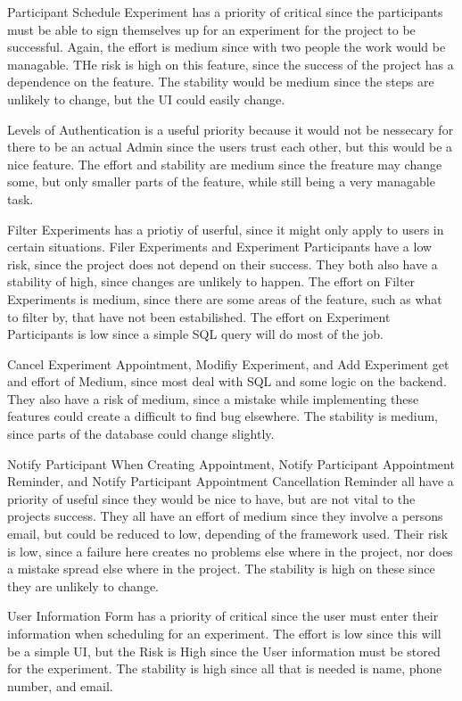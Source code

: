 Participant Schedule Experiment has a priority of critical since the participants must be able to sign themselves up for an experiment for the project to be successful.  Again, the effort is medium since with two people the work would be managable.  THe risk is high on this feature, since the success of the project has a dependence on the feature.  The stability would be medium since the steps are unlikely to change, but the UI could easily change.

Levels of Authentication is a useful priority because it would not be nessecary for there to be an actual Admin since the users trust each other, but this would be a nice feature.  The effort and stability are medium since the freature may change some, but only smaller parts of the feature, while still being a very managable task.

Filter Experiments has a priotiy of userful, since it might only apply to users in certain situations.  Filer Experiments and Experiment Participants have a low risk, since the project does not depend on their success.  They both also have a stability of high, since changes are unlikely to happen.  The effort on Filter Experiments is medium, since there are some areas of the feature, such as what to filter by, that have not been estabilished.  The  effort on Experiment Participants is low since a simple SQL query will do most of the job.

Cancel Experiment Appointment, Modifiy Experiment, and Add Experiment get and effort of Medium, since most deal with SQL and some logic on the backend.  They also have a risk of medium, since a mistake while implementing these features could create a difficult to find bug elsewhere.  The stability is medium, since parts of the database could change slightly.

Notify Participant When Creating Appointment, Notify Participant Appointment Reminder, and Notify Participant Appointment Cancellation Reminder all have a priority of useful since they would be nice to have, but are not vital to the projects success.  They all have an effort of medium since they involve a persons email, but could be reduced to low, depending of the framework used.  Their risk is low, since a failure here creates no problems else where in the project, nor does a mistake spread else where in the project.  The stability is high on these since they are unlikely to change.

User Information Form has a priority of critical since the user must enter their information when scheduling for an experiment.  The effort is low since this will be a simple UI, but the Risk is High since the User information must be stored for the experiment.  The stability is high since all that is needed is name, phone number, and email.  

